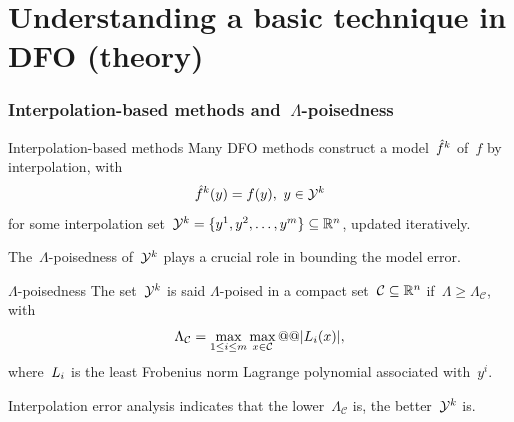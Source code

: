\documentclass{polyu-presentation}
\newcommand{\iter}[1][]{x\ifthenelse{\equal{#1}{}}{}{^{#1}}}
\newcommand{\lagp}[1][]{L\ifthenelse{\equal{#1}{}}{}{_{#1}}}
\newcommand{\obj}{f}
\newcommand{\objm}[1][]{\hat{f}\ifthenelse{\equal{#1}{}}{}{^{#1}}}
\newcommand{\xpt}[1][]{\mathcal{Y}\ifthenelse{\equal{#1}{}}{}{^{#1}}}
\begin{document}
\section{Understanding a basic technique in DFO (\textbf{theory})}

\begin{frame}
    \frametitle{Interpolation-based methods and~$\Lambda$-poisedness}
    
    \begin{block}{Interpolation-based methods}
        Many DFO methods construct a \alert{model}~$\objm[k]$ of~$\obj$ by \alert{interpolation}, with
        \setlength{\abovedisplayskip}{7pt}
        \setlength{\belowdisplayskip}{7pt}
        \begin{equation*}
            \objm[k](y) = \obj(y), ~ y \in \xpt[k]
        \end{equation*}
        for some \alert{interpolation set}~$\xpt[k] = \set{y^1, y^2, \dots, y^m} \subseteq \R^n$, updated iteratively.
    \end{block}

    The~\alert{$\Lambda$-poisedness} of~$\xpt[k]$ plays a crucial role in bounding the model error.

    \begin{block}{$\Lambda$-poisedness \parencite{Conn_Scheinberg_Vicente_2009b}}
        The set~$\xpt[k]$ is said \alert{$\Lambda$-poised} in a compact set~$\mathcal{C} \subseteq \mathbb{R}^n$ if~\alert{$\Lambda \ge \Lambda_{\mathcal{C}}$}, with
        \setlength{\abovedisplayskip}{7pt}
        \setlength{\belowdisplayskip}{7pt}
        \begin{equation*}
            \Lambda_{\mathcal{C}} = \max_{1 \le i \le m} \max_{\iter \in \mathcal{C}} @@ \abs{\lagp[i](\iter)},
        \end{equation*}
        where~$\lagp[i]$ is the least Frobenius norm \alert{Lagrange polynomial} associated with~$y^i$.
    \end{block}

    Interpolation error analysis indicates that the \alert{lower}~$\Lambda_{\mathcal{C}}$ is, the \alert{better}~$\xpt[k]$ is.
\end{frame}
\end{document}
